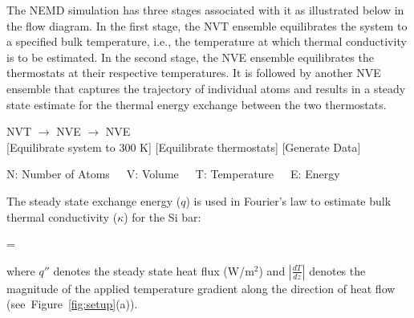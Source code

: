 The NEMD simulation has three stages associated with it as illustrated below in the flow diagram. In the
first stage, the NVT ensemble equilibrates the system to a specified bulk temperature, i.e., the temperature
at which thermal conductivity is to be estimated. In the second stage, the NVE ensemble equilibrates the
thermostats at their respective temperatures. It is followed by another NVE ensemble that captures the
trajectory of individual atoms and results in a steady state estimate for the thermal energy exchange between
the two thermostats. 

\begin{center}

NVT \hspace{5mm} $\rightarrow$ \hspace{5mm} NVE \hspace{5mm}
$\rightarrow$ \hspace{5mm} NVE
\\ \vspace{1mm}
\tiny \hspace{-5mm}[Equilibrate system to 300 K] \hspace{1mm} [Equilibrate thermostats] \hspace{4mm}
 [Generate Data]
\\ \vspace{1mm}

\tiny{N: Number of Atoms~~~V: Volume~~~T: Temperature~~~E: Energy}
\end{center}

The steady state exchange energy ($q$) is used in Fourier's law to estimate bulk thermal conductivity ($\kappa$)
for the Si  bar:

\be
 \kappa =  
\ee

\noindent where $q''$ denotes the steady state heat flux (W/m$^2$) and
$\left|\frac{dT}{dz}\right|$ denotes the magnitude of the applied 
temperature gradient along the direction of heat flow (see~Figure~\ref{fig:setup}(a)).






















